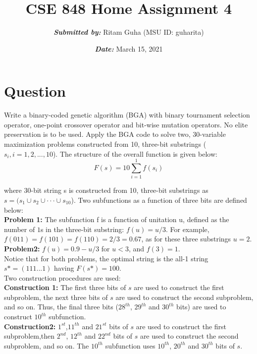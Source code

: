 \documentclass{article}
\title{\textbf{CSE 848 Home Assignment 4}}
\author{\textbf{\textit{Submitted by:}} Ritam Guha (MSU ID: guharita)}
\date{\textbf{\textit{Date:}} March 15, 2021}
\begin{document}
	
	\maketitle
	
	\section{Question}
	Write a binary-coded genetic algorithm (BGA) with binary tournament selection operator, one-point crossover operator and bit-wise mutation operators. No elite preservation is to be used. Apply the BGA code to solve two, 30-variable maximization problems constructed from 10, three-bit substrings ($s_i, i = 1, 2, . . . , 10$). The structure of the overall function is given below:
	\begin{equation}
		\displaystyle F(s) = 10 \sum_{i=1}^1 f(s_i)
	\end{equation}

	where 30-bit string s is constructed from 10, three-bit substrings as $s = (s_1 \cup s_2 \cup · · · \cup s_10$). Two subfunctions as a function of three bits are defined below:\\
	
	
	\textbf{Problem 1:} The subfunction f is a function of unitation u, defined as the number of $1$s in the three-bit substring: $f(u) = u/3$. For example, $f(011) = f(101) = f(110) = 2/3 = 0.67$, as for these three substrings $u = 2$.\\
	
	\textbf{Problem2:} $f(u)=0.9-u/3$ for $u<3$, and $f(3)=1$.\\
	
	Notice that for both problems, the optimal string is the all-1 string $s\text{*} =(111 . . . 1)$ having $F (s\text{*} )=100$.\\
	
	Two construction procedures are used:\\
	
	\textbf{Construction 1:} The first three bits of $s$ are used to construct the first subproblem, the next three bits of $s$ are used to construct the second subproblem, and so on. Thus, the final three bits ($28^{th}$, $29^{th}$ and $30^{th}$ bits) are used to construct $10^{th}$ subfunction.\\
	
	\textbf{Construction2:} $1^{st}$,$11^{th}$ and $21^{st}$ bits of $s$ are used to construct the first subproblem,then $2^{nd}$, $12^{th}$ and $22^{nd}$ bits of $s$ are used to construct the second subproblem, and so on. The $10^{th}$ subfunction uses $10^{th}$, $20^{th}$ and $30^{th}$ bits of $s$.\\
	
\end{document}
